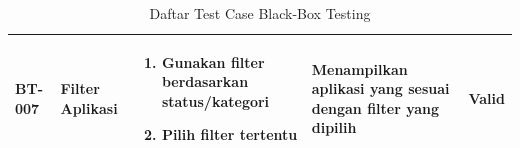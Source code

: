 \begin{table}[h]
\begin{adjustbox}{width=\textwidth}
\begin{tabular}{|p{0.8cm}|p{2.2cm}|p{4cm}|p{3.5cm}|p{1.2cm}|}
      BT-007            & Filter Aplikasi           & \begin{enumerate}[leftmargin=*,noitemsep,topsep=0pt,label=\arabic*.,widest=99]
                                                        \item Gunakan filter berdasarkan status/kategori
                                                        \item Pilih filter tertentu
                                                      \end{enumerate} & Menampilkan aplikasi yang sesuai dengan filter yang dipilih        & Valid                                                             \\ \hline
    \end{tabular}
  \end{adjustbox}
  \caption{Daftar Test Case Black-Box Testing}
  \label{tab:test-case}
\end{table}

